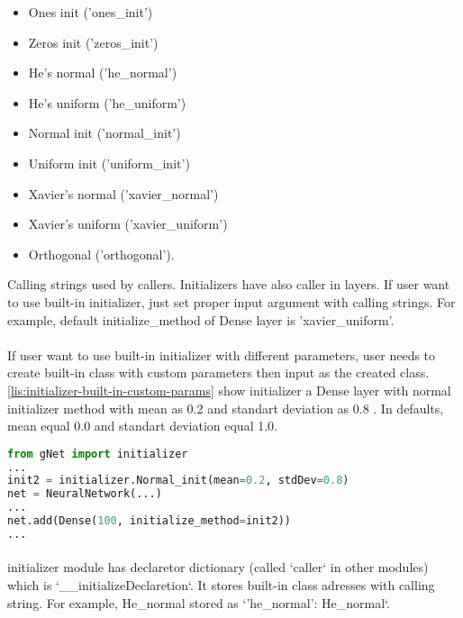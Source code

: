 \documentclass[12pt]{report}
\begin{document}
\begin{itemize}
 	\item Ones init ('ones\_init')
	\item Zeros init ('zeros\_init')
	\item He's normal ('he\_normal')
	\item He's uniform ('he\_uniform')
	\item Normal init ('normal\_init')
	\item Uniform init ('uniform\_init')
	\item Xavier's normal ('xavier\_normal')
	\item Xavier's uniform ('xavier\_uniform')
	\item Orthogonal ('orthogonal').
\end{itemize}

Calling strings used by callers. Initializers have also caller in layers. If user want to use built-in initializer, just set proper input argument with calling strings. For example, default initialize\_method of Dense layer is 'xavier\_uniform'.


\paragraph{}
If user want to use built-in initializer with different parameters, user needs to create built-in class with custom parameters then input as the created class. \ref{lis:initializer-built-in-custom-params} show initializer a Dense layer with normal initializer method with mean as 0.2 and standart deviation as 0.8 . In defaults, mean equal 0.0 and standart deviation equal 1.0.


\begin{lstlisting}[language=Python, numbers=none, caption={Built-in initializer with custom parameters.}, label={lis:initializer-built-in-custom-params}]
from gNet import initializer
...
init2 = initializer.Normal_init(mean=0.2, stdDev=0.8)
net = NeuralNetwork(...)
...
net.add(Dense(100, initialize_method=init2))
...
\end{lstlisting}

\paragraph{}
initializer module has declaretor dictionary (called `caller` in other modules) which is `\_\_initializeDeclaretion`. It stores built-in class adresses with calling string. For example, He\_normal stored as `'he\_normal': He\_normal`.
\end{document}
